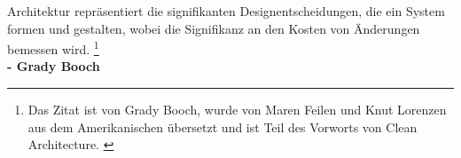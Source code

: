 
\thispagestyle{plain}
\begin{titlepage}

\begin{center}

\large{
    Architektur repräsentiert die signifikanten Designentscheidungen,
    die ein System formen und gestalten,
    wobei die Signifikanz an den Kosten von Änderungen bemessen wird.
    \footnote[1]{Das Zitat ist von Grady Booch, wurde von Maren Feilen und Knut Lorenzen aus
    dem Amerikanischen übersetzt und ist Teil des Vorworts von Clean
    Architecture. \cite[S. 17]{RobertC.Martin2018}}
}\\[2ex]
\small{\textbf{- Grady Booch}}
\end{center}

\end{titlepage}

\restoregeometry
